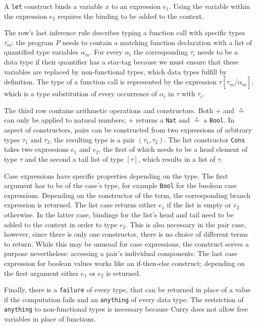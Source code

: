 \documentclass[paper = a4, fleqn, twoside]{scrreprt}
\begin{document}
A \texttt{let} construct binds a variable $x$ to an expression $e_{1}$. Using the variable within the expression $e_{2}$ requires the binding to be added to the context.
\par
The row's last inference rule describes typing a function call with specific types $\overline{\tau_{m}}$: the program $P$ needs to contain a matching function declaration with a list of quantified type variables $\overline{\alpha_{m}}$. For every $\alpha_{i}$ the corresponding $\tau_{i}$ needs to be a data type if their quantifier has a star-tag because we must ensure that these variables are replaced by non-functional types, which data types fulfill by definition. The type of a function call is represented by the expression $\tau [\overline{\tau_{m}/\alpha_{m}}]$, which is a type substitution of every occurrence of $\alpha_{i}$ in $\tau$ with $\tau_{i}$.
\par
The third row contains arithmetic operations and constructors. Both $+$ and $\circeq$ can only be applied to natural numbers; $+$ returns a \texttt{Nat} and $\circeq$ a \texttt{Bool}. In aspect of constructors, pairs can be constructed from two expressions of arbitrary types $\tau_{1}$ and $\tau_{2}$, the resulting type is a pair $(\tau_{1}, \tau_{2})$. The list constructor \texttt{Cons} takes two expressions $e_{1}$ and $e_{2}$, the first of which needs to be a head element of type $\tau$ and the second a tail list of type $[\tau]$, which results in a list of $\tau$.
\par
Case expressions have specific properties depending on the type. The first argument has to be of the case's type, for example \texttt{Bool} for the boolean case expressions. Depending on the constructor of the term, the corresponding branch expression is returned. The list case returns either $e_{1}$ if the list is empty or $e_{2}$ otherwise. In the latter case, bindings for the list's head and tail need to be added to the context in order to type $e_{2}$. This is also necessary in the pair case, however, since there is only one constructor, there is no choice of different terms to return. While this may be unusual for case expressions, the construct serves a purpose nevertheless: accessing a pair's individual components. The last case expression for boolean values works like an if-then-else construct; depending on the first argument either $e_{1}$ or $e_{2}$ is returned.
\par
Finally, there is a \texttt{failure} of every type, that can be returned in place of a value if the computation fails and an \texttt{anything} of every data type. The restriction of \texttt{anything} to non-functional types is necessary because Curry does not allow free variables in place of functions.\\
\end{document}
